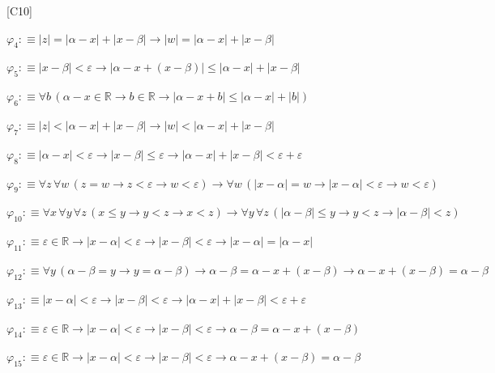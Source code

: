 \begin{fullproof}{[C10]}
\begin{abbrevlist}
\item $\varphi_{4} :\equiv \lvert z \rvert = \lvert \alpha - x \rvert + \lvert x - \beta \rvert \to \lvert w \rvert = \lvert \alpha - x \rvert + \lvert x - \beta \rvert$
\item $\varphi_{5} :\equiv \lvert x - \beta \rvert < \varepsilon \to \lvert \alpha - x + (x - \beta) \rvert \leq \lvert \alpha - x \rvert + \lvert x - \beta \rvert$
\item $\varphi_{6} :\equiv \forall b\,(\alpha - x \in \mathbb{R} \to b \in \mathbb{R} \to \lvert \alpha - x + b \rvert \leq \lvert \alpha - x \rvert + \lvert b \rvert)$
\item $\varphi_{7} :\equiv \lvert z \rvert < \lvert \alpha - x \rvert + \lvert x - \beta \rvert \to \lvert w \rvert < \lvert \alpha - x \rvert + \lvert x - \beta \rvert$
\item $\varphi_{8} :\equiv \lvert \alpha - x \rvert < \varepsilon \to \lvert x - \beta \rvert \leq \varepsilon \to \lvert \alpha - x \rvert + \lvert x - \beta \rvert < \varepsilon + \varepsilon$
\item $\varphi_{9} :\equiv \forall z\,\forall w\,(z = w \to z < \varepsilon \to w < \varepsilon) \to \forall w\,(\lvert x - \alpha \rvert = w \to \lvert x - \alpha \rvert < \varepsilon \to w < \varepsilon)$
\item $\varphi_{10} :\equiv \forall x\,\forall y\,\forall z\,(x \leq y \to y < z \to x < z) \to \forall y\,\forall z\,(\lvert \alpha - \beta \rvert \leq y \to y < z \to \lvert \alpha - \beta \rvert < z)$
\item $\varphi_{11} :\equiv \varepsilon \in \mathbb{R} \to \lvert x - \alpha \rvert < \varepsilon \to \lvert x - \beta \rvert < \varepsilon \to \lvert x - \alpha \rvert = \lvert \alpha - x \rvert$
\item $\varphi_{12} :\equiv \forall y\,(\alpha - \beta = y \to y = \alpha - \beta) \to \alpha - \beta = \alpha - x + (x - \beta) \to \alpha - x + (x - \beta) = \alpha - \beta$
\item $\varphi_{13} :\equiv \lvert x - \alpha \rvert < \varepsilon \to \lvert x - \beta \rvert < \varepsilon \to \lvert \alpha - x \rvert + \lvert x - \beta \rvert < \varepsilon + \varepsilon$
\item $\varphi_{14} :\equiv \varepsilon \in \mathbb{R} \to \lvert x - \alpha \rvert < \varepsilon \to \lvert x - \beta \rvert < \varepsilon \to \alpha - \beta = \alpha - x + (x - \beta)$
\item $\varphi_{15} :\equiv \varepsilon \in \mathbb{R} \to \lvert x - \alpha \rvert < \varepsilon \to \lvert x - \beta \rvert < \varepsilon \to \alpha - x + (x - \beta) = \alpha - \beta$

\end{abbrevlist}
\end{fullproof}
